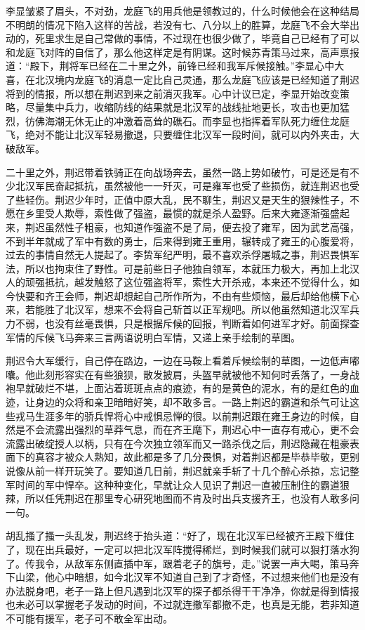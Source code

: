 李显皱紧了眉头，不对劲，龙庭飞的用兵他是领教过的，什么时候他会在这种结局不明朗的情况下陷入这样的苦战，若没有七、八分以上的胜算，龙庭飞不会大举出动的，死里求生是自己常做的事情，不过现在也很少做了，毕竟自己已经有了可以和龙庭飞对阵的自信了，那么他这样定是有阴谋。这时候苏青策马过来，高声禀报道：“殿下，荆将军已经在二十里之外，前锋已经和我军斥候接触。”李显心中大喜，在北汉境内龙庭飞的消息一定比自己灵通，那么龙庭飞应该是已经知道了荆迟将到的情报，所以想在荆迟到来之前消灭我军。心中计议已定，李显开始改变策略，尽量集中兵力，收缩防线的结果就是北汉军的战线扯地更长，攻击也更加猛烈，彷佛海潮无休无止的冲激着高耸的礁石。而李显也指挥着军队死力缠住龙庭飞，绝对不能让北汉军轻易撤退，只要缠住北汉军一段时间，就可以内外夹击，大破敌军。

二十里之外，荆迟带着铁骑正在向战场奔去，虽然一路上势如破竹，可是还是有不少北汉军民奋起抵抗，虽然被他一一歼灭，可是雍军也受了些损伤，就连荆迟也受了些轻伤。荆迟少年时，正值中原大乱，民不聊生，荆迟又是天生的狠辣性子，不愿在乡里受人欺辱，索性做了强盗，最惯的就是杀人盈野。后来大雍逐渐强盛起来，荆迟虽然性子粗豪，也知道作强盗不是了局，便去投了雍军，因为武艺高强，不到半年就成了军中有数的勇士，后来得到雍王重用，辗转成了雍王的心腹爱将，过去的事情自然无人提起了。李贽军纪严明，最不喜欢杀俘屠城之事，荆迟畏惧军法，所以也拘束住了野性。可是前些日子他独自领军，本就压力极大，再加上北汉人的顽强抵抗，越发触怒了这位强盗将军，索性大开杀戒，本来还不觉得什么，如今快要和齐王会师，荆迟却想起自己所作所为，不由有些烦恼，最后却给他横下心来，若能胜了北汉军，想来不会将自己斩首以正军规吧。所以他虽然知道北汉军兵力不弱，也没有丝毫畏惧，只是根据斥候的回报，判断着如何进军才好。前面探查军情的斥候飞马奔来三言两语说明白军情，又递上亲手绘制的草图。

荆迟令大军缓行，自己停在路边，一边在马鞍上看着斥候绘制的草图，一边低声嘟囔。他此刻形容实在有些狼狈，散发披肩，头盔早就被他不知何时丢落了，一身战袍早就破烂不堪，上面沾着斑斑点点的痕迹，有的是黄色的泥水，有的是红色的血迹，让身边的众将和亲卫暗暗好笑，却不敢多言。一路上荆迟的霸道和杀气可让这些戎马生涯多年的骄兵悍将心中戒惧忌惮的很。以前荆迟跟在雍王身边的时候，自然是不会流露出强烈的草莽气息，而在齐王麾下，荆迟心中一直存有戒心，更不会流露出破绽授人以柄，只有在今次独立领军而又一路杀伐之后，荆迟隐藏在粗豪表面下的真容才被众人熟知，故此都是多了几分畏惧，对着荆迟都是毕恭毕敬，更别说像从前一样开玩笑了。要知道几日前，荆迟就亲手斩了十几个醉心杀掠，忘记整军时间的军中悍卒。这种种变化，早就让众人见识了荆迟一直被压制住的霸道狠辣，所以任凭荆迟在那里专心研究地图而不肯及时出兵支援齐王，也没有人敢多问一句。

胡乱搔了搔一头乱发，荆迟终于抬头道：“好了，现在北汉军已经被齐王殿下缠住了，现在出兵最好，一定可以把北汉军阵搅得稀烂，到时候我们就可以狠打落水狗了。传我令，从敌军东侧直插中军，跟着老子的旗号，走。”说罢一声大喝，策马奔下山梁，他心中暗想，如今北汉军不知道自己到了才奇怪，不过想来他们也是没有办法脱身吧，老子一路上但凡遇到北汉军的探子都杀得干干净净，你就是得到情报也未必可以掌握老子发动的时间，不过就连撤军都撤不走，也真是无能，若非知道不可能有援军，老子可不敢全军出动。

